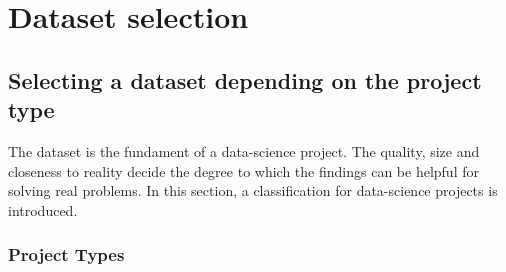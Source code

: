 \chapter{Dataset selection}
\section{Selecting a dataset depending on the project type}
	The dataset is the fundament of a data-science project. The quality, size and closeness to reality decide the degree to which the findings can be helpful for solving real problems. 
	In this section, a classification for data-science projects is introduced.
	
	\subsection{Project Types}
